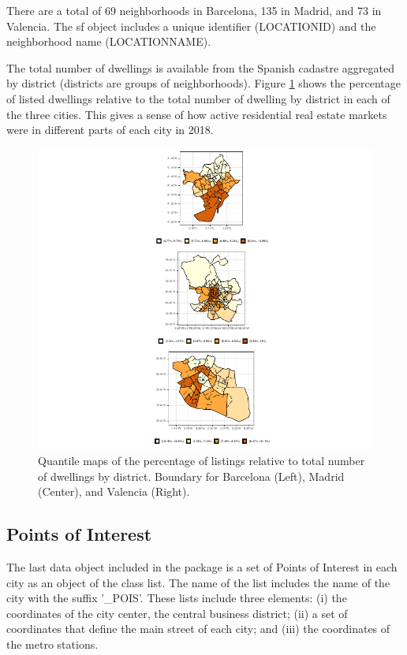 \documentclass[Royal,times,sageh]{sagej}
\begin{document}
There are a total of 69 neighborhoods in Barcelona, 135 in Madrid, and
73 in Valencia. The sf object includes a unique identifier (LOCATIONID)
and the neighborhood name (LOCATIONNAME).

The total number of dwellings is available from the Spanish cadastre
aggregated by district (districts are groups of neighborhoods). Figure
\ref{fig:districts} shows the percentage of listed dwellings relative to
the total number of dwelling by district in each of the three cities.
This gives a sense of how active residential real estate markets were in
different parts of each city in 2018.

\begin{figure}
\centering
\includegraphics{main_EPB_files/figure-latex/unnamed-chunk-2-1.pdf}
\caption{\label{fig:districts}Quantile maps of the percentage of
listings relative to total number of dwellings by district. Boundary for
Barcelona (Left), Madrid (Center), and Valencia (Right).}
\end{figure}

\hypertarget{points-of-interest}{%
\subsection{Points of Interest}\label{points-of-interest}}

The last data object included in the package is a set of Points of
Interest in each city as an object of the class list. The name of the
list includes the name of the city with the suffix '\_POIS'. These lists
include three elements: (i) the coordinates of the city center, the
central business district; (ii) a set of coordinates that define the
main street of each city; and (iii) the coordinates of the metro
stations.
\end{document}

